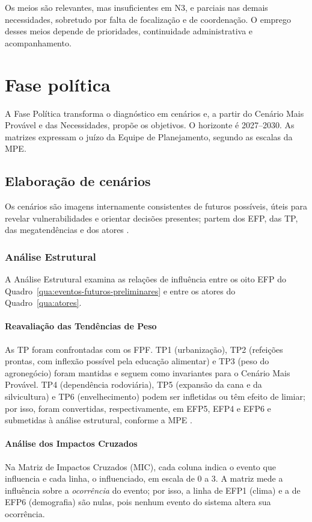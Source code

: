 \documentclass[
	12pt,				%
	openright,			%
	oneside,			%
	a4paper,			%
	chapter=TITLE,		%
	section=TITLE,		%
	english,			%
	french,				%
	spanish,			%
	brazil,				%
 ]{abntex2}
\begin{document}
Os meios são relevantes, mas insuficientes em N3, e parciais nas demais
necessidades, sobretudo por falta de focalização e de coordenação. O emprego
desses meios depende de prioridades, continuidade administrativa e
acompanhamento.

\chapter{Fase política}
A Fase Política transforma o diagnóstico em cenários e, a partir do Cenário
Mais Provável e das Necessidades, propõe os objetivos.
O horizonte é 2027--2030. As matrizes expressam o juízo da Equipe de
Planejamento, segundo as escalas da MPE.

\section{Elaboração de cenários}
Os cenários são imagens internamente consistentes de futuros possíveis, úteis
para revelar vulnerabilidades e orientar decisões presentes; partem dos EFP,
das TP, das megatendências e dos atores
\cite[p. 13]{araujo_cenarios2026}.

\subsection{Análise Estrutural}
A Análise Estrutural examina as relações de influência entre os oito EFP do
Quadro~\ref{qua:eventos-futuros-preliminares} e entre os atores do
Quadro~\ref{qua:atores}.

\subsubsection{Reavaliação das Tendências de Peso}
As TP foram confrontadas com os FPF. TP1 (urbanização), TP2 (refeições prontas,
com inflexão possível pela educação alimentar) e TP3 (peso do agronegócio)
foram mantidas e seguem como invariantes para o Cenário Mais Provável. TP4
(dependência rodoviária), TP5 (expansão da cana e da silvicultura) e TP6
(envelhecimento) podem ser infletidas ou têm efeito de limiar; por isso, foram
convertidas, respectivamente, em EFP5, EFP4 e EFP6 e submetidas à análise
estrutural, conforme a MPE \cite[p. 82--84]{esg_mpe2026}.

\subsubsection{Análise dos Impactos Cruzados}
Na Matriz de Impactos Cruzados (MIC), cada coluna indica o evento que influencia
e cada linha, o influenciado, em escala de 0 a 3. A matriz mede a influência
sobre a \textit{ocorrência} do evento; por isso, a linha de EFP1 (clima) e a de
EFP6 (demografia) são nulas, pois nenhum evento do sistema altera sua
ocorrência.
\end{document}
